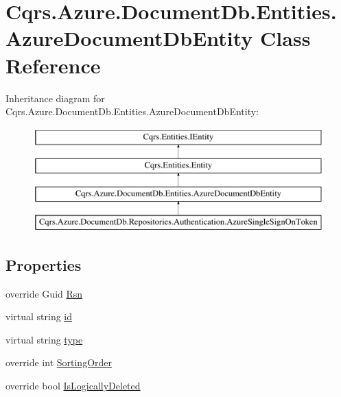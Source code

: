 \hypertarget{classCqrs_1_1Azure_1_1DocumentDb_1_1Entities_1_1AzureDocumentDbEntity}{}\section{Cqrs.\+Azure.\+Document\+Db.\+Entities.\+Azure\+Document\+Db\+Entity Class Reference}
\label{classCqrs_1_1Azure_1_1DocumentDb_1_1Entities_1_1AzureDocumentDbEntity}
Inheritance diagram for Cqrs.\+Azure.\+Document\+Db.\+Entities.\+Azure\+Document\+Db\+Entity\+:\begin{figure}[H]
\begin{center}
\leavevmode
\includegraphics[height=4.000000cm]{classCqrs_1_1Azure_1_1DocumentDb_1_1Entities_1_1AzureDocumentDbEntity}
\end{center}
\end{figure}
\subsection*{Properties}
\begin{DoxyCompactItemize}
\item 
override Guid \hyperlink{classCqrs_1_1Azure_1_1DocumentDb_1_1Entities_1_1AzureDocumentDbEntity_a9f8073973963c42fc44bb5fba84cf70a}{Rsn}
\item 
virtual string \hyperlink{classCqrs_1_1Azure_1_1DocumentDb_1_1Entities_1_1AzureDocumentDbEntity_a70118763769fc358c7206ef04f12ff6f}{id}
\item 
virtual string \hyperlink{classCqrs_1_1Azure_1_1DocumentDb_1_1Entities_1_1AzureDocumentDbEntity_a4696c1d70da779b260ba76588aff80a7}{type}
\item 
override int \hyperlink{classCqrs_1_1Azure_1_1DocumentDb_1_1Entities_1_1AzureDocumentDbEntity_a65addaa44fbb57497e730f4f806bc820}{Sorting\+Order}
\item 
override bool \hyperlink{classCqrs_1_1Azure_1_1DocumentDb_1_1Entities_1_1AzureDocumentDbEntity_ad3a216109e53eaa53aa1aa18eaea1f3a}{Is\+Logically\+Deleted}
\end{DoxyCompactItemize}


